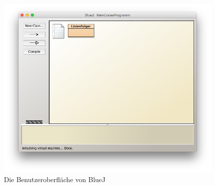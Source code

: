 \documentclass[paper=a4, DIV=calc, BCOR=12mm, twoside=on, onecolumn=on, open = right, titlepage =on, parskip =half-, headsepline = on, footsepline = off, chapterprefix = off, appendixprefix = on, fontsize = 12pt, numbers = noenddot, abstract = on]{scrbook}
\begin{document}
\begin{figure}[htbp]
\centering
\includegraphics[scale=0.5]{images/firstprogram.png}
\caption{Die Benutzeroberfläche von BlueJ}
\label{fig:BlueJ UI}
\end{figure}
\end{document}
